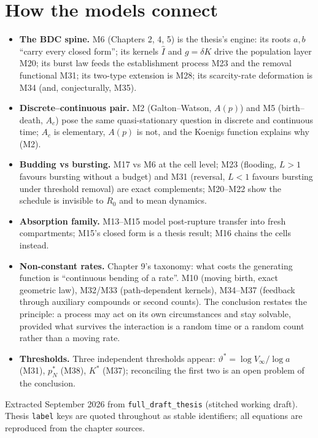 \documentclass[11pt,a4paper]{article}
\begin{document}
\section{How the models connect}

\begin{itemize}
\item \textbf{The BDC spine.} M6 (Chapters 2, 4, 5) is the thesis's
  engine: its roots $a,b$ ``carry every closed form''; its kernels
  $\hat I$ and $g=\delta K$ drive the population layer M20; its burst law
  feeds the establishment process M23 and the removal functional M31; its
  two-type extension is M28; its scarcity-rate deformation is M34 (and,
  conjecturally, M35).
\item \textbf{Discrete--continuous pair.} M2 (Galton--Watson, $A(p)$) and
  M5 (birth--death, $A_c$) pose the same quasi-stationary question in
  discrete and continuous time; $A_c$ is elementary, $A(p)$ is not, and the
  Koenigs function explains why (M2).
\item \textbf{Budding vs bursting.} M17 vs M6 at the cell level; M23
  (flooding, $L>1$ favours bursting without a budget) and M31 (reversal,
  $L<1$ favours bursting under threshold removal) are exact complements;
  M20--M22 show the schedule is invisible to $R_0$ and to mean dynamics.
\item \textbf{Absorption family.} M13--M15 model post-rupture transfer
  into fresh compartments; M15's closed form is a thesis result; M16 chains
  the cells instead.
\item \textbf{Non-constant rates.} Chapter 9's taxonomy: what costs the
  generating function is ``continuous bending of a rate''. M10 (moving
  birth, exact geometric law), M32/M33 (path-dependent kernels), M34--M37
  (feedback through auxiliary compounds or second counts). The conclusion
  restates the principle: a process may act on its own circumstances and
  stay solvable, provided what survives the interaction is a random time
  or a random count rather than a moving rate.
\item \textbf{Thresholds.} Three independent thresholds appear:
  $\vartheta^*=\log V_\infty/\log a$ (M31), $p_N^*$ (M38), $K^*$
  (M37); reconciling the first two is an open problem of the conclusion.
\end{itemize}

\vfill
\begin{center}\small
Extracted September 2026 from \texttt{full\_draft\_thesis} (stitched working
draft). Thesis \texttt{label} keys are quoted throughout as stable
identifiers; all equations are reproduced from the chapter sources.
\end{center}
\end{document}
